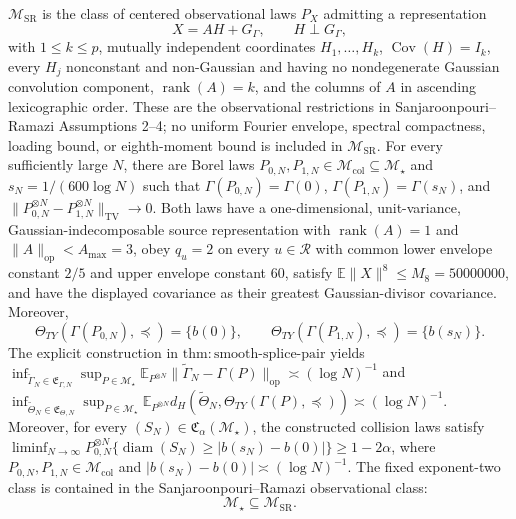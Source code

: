 \(\mathcal M_{\mathrm{SR}}\) is the class of centered observational laws \(P_X\) admitting a representation
\[
 X=AH+G_\Gamma,\qquad H\perp G_\Gamma,
\]
with \(1\le k\le p\), mutually independent coordinates \(H_1,\ldots,H_k\), \(\operatorname{Cov}(H)=I_k\), every \(H_j\) nonconstant and non-Gaussian and having no nondegenerate Gaussian convolution component, \(\operatorname{rank}(A)=k\), and the columns of \(A\) in ascending lexicographic order.  These are the observational restrictions in Sanjaroonpouri--Ramazi Assumptions 2--4; no uniform Fourier envelope, spectral compactness, loading bound, or eighth-moment bound is included in \(\mathcal M_{\mathrm{SR}}\).
For every sufficiently large \(N\), there are Borel laws \(P_{0,N},P_{1,N}\in\mathcal M_{\mathrm{col}}\subseteq\mathcal M_\star\) and \(s_N=1/(600\log N)\) such that \(\Gamma(P_{0,N})=\Gamma(0)\), \(\Gamma(P_{1,N})=\Gamma(s_N)\), and \(\|P_{0,N}^{\otimes N}-P_{1,N}^{\otimes N}\|_{\mathrm{TV}}\to0\).  Both laws have a one-dimensional, unit-variance, Gaussian-indecomposable source representation with \(\operatorname{rank}(A)=1\) and \(\|A\|_{\mathrm{op}}<A_{\max}=3\), obey \(q_u=2\) on every \(u\in\mathcal R\) with common lower envelope constant \(2/5\) and upper envelope constant \(60\), satisfy \(\mathbb E\|X\|^8\le M_8=50000000\), and have the displayed covariance as their greatest Gaussian-divisor covariance.  Moreover,
\[
 \Theta_{TY}(\Gamma(P_{0,N}),\preceq)=\{b(0)\},\qquad
 \Theta_{TY}(\Gamma(P_{1,N}),\preceq)=\{b(s_N)\}.
\]
The explicit construction in \(\mathrm{thm:smooth\text{-}splice\text{-}pair}\) yields \(\inf_{\widetilde\Gamma_N\in\mathfrak E_{\Gamma,N}}\sup_{P\in\mathcal M_\star}\mathbb E_{P^{\otimes N}}\|\widetilde\Gamma_N-\Gamma(P)\|_{\mathrm{op}}\asymp(\log N)^{-1}\) and \(\inf_{\widetilde\Theta_N\in\mathfrak E_{\Theta,N}}\sup_{P\in\mathcal M_\star}\mathbb E_{P^{\otimes N}}d_H(\widetilde\Theta_N,\Theta_{TY}(\Gamma(P),\preceq))\asymp(\log N)^{-1}\). Moreover, for every \((S_N)\in\mathfrak C_\alpha(\mathcal M_\star)\), the constructed collision laws satisfy \(\liminf_{N\to\infty}P_{0,N}^{\otimes N}\{\operatorname{diam}(S_N)\ge|b(s_N)-b(0)|\}\ge1-2\alpha\), where \(P_{0,N},P_{1,N}\in\mathcal M_{\mathrm{col}}\) and \(|b(s_N)-b(0)|\asymp(\log N)^{-1}\).
The fixed exponent-two class is contained in the Sanjaroonpouri--Ramazi observational class:
\[
 \mathcal M_\star\subseteq\mathcal M_{\mathrm{SR}}.
\]
